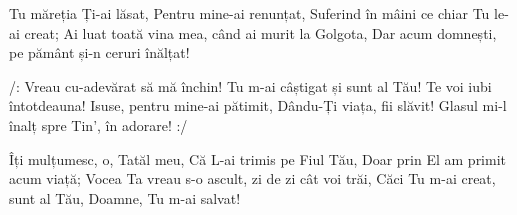 \beginverse
Tu măreția Ți-ai lăsat,
Pentru mine-ai renunțat,
Suferind în mâini ce chiar Tu le-ai creat;
Ai luat toată vina mea, când ai murit la Golgota,
Dar acum domnești, pe pământ și-n ceruri înălțat!
\endverse

\beginchorus
/: Vreau cu-adevărat să mă închin!
Tu m-ai câștigat și sunt al Tău!
Te voi iubi întotdeauna!
Isuse, pentru mine-ai pătimit,
Dându-Ți viața, fii slăvit!
Glasul mi-l înalț spre Tin’, în adorare! :/
\endchorus

\beginverse
Îți mulțumesc, o, Tatăl meu,
Că L-ai trimis pe Fiul Tău,
Doar prin El am primit acum viață;
Vocea Ta vreau s-o ascult, zi de zi cât voi trăi,
Căci Tu m-ai creat, sunt al Tău,
Doamne, Tu m-ai salvat!
\endverse
\endsong